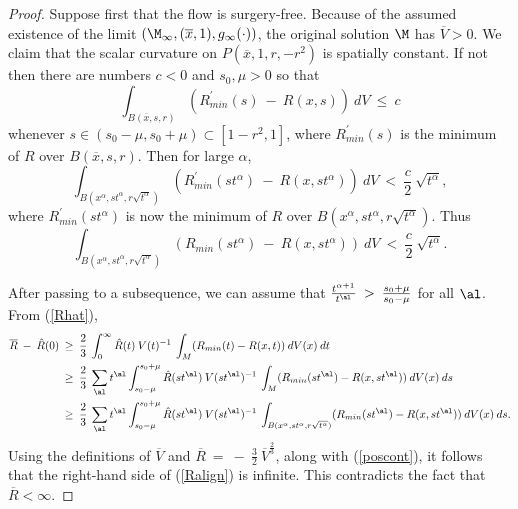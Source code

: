 \begin{proof}
Suppose first that the flow is surgery-free. Because of the assumed existence of the limit
$(\M_\infty, (\overline{x}, 1), g_\infty(\cdot))$, the
original solution $\M$ has $\overline{V} > 0$.
We claim that the scalar curvature
on $P(\overline{x}, 1, r, -r^2)$ is spatially constant.
If not then there are numbers $c<0$ and $s_0, \mu > 0$ so that
\begin{equation}
\int_{B(\overline{x}, {s}, r)} (R^\prime_{min}({s})
\: - \: R(x, {s})) \: dV \: \le \: c
\end{equation}
whenever ${s} \in (s_0 - \mu, s_0 + \mu) \subset [1-r^2, 1]$,
where $R^\prime_{min}({s})$
is the minimum of $R$ over
$B(\overline{x}, {s}, r)$. Then for large $\alpha$,
\begin{equation}
\int_{B(x^\alpha, {s} t^\alpha, r \sqrt{t^\alpha})}
(R^\prime_{min}({s} t^\alpha)
\: - \: R(x, {s} t^\alpha)) \: dV \: < \: \frac{c}{2}
\: \sqrt{t^\alpha},
\end{equation}
where $R^\prime_{min}({s} t^\alpha)$ is now the minimum of $R$ over
$B(x^\alpha, {s} t^\alpha, r \sqrt{t^\alpha})$.
Thus
\begin{equation} \label{poscont}
\int_{B(x^\alpha, {s} t^\alpha, r \sqrt{t^\alpha})}
(R_{min}({s} t^\alpha) \: - \: R(x, {s} t^\alpha)) \:
dV \: < \: \frac{c}{2}
\: \sqrt{t^\alpha}.
\end{equation}

After passing to a subsequence, we can assume that
$\frac{t^{\alpha + 1}}{t^\al} \: > \: \frac{s_0 + \mu}{s_0 - \mu}$ for
all $\al$. From (\ref{Rhat}),
\begin{align} \label{Ralign}
\overline{R} \: - \: \hat{R}(0) \: & \ge \:
\frac23 \: \int_0^\infty \hat{R}(t) \: V(t)^{-1} \:
\int_M (R_{min}(t) - R(x,t)) \: dV(x) \: dt \\
& \ge \:
\frac23 \: \sum_{\al} t^\al
\int_{s_0- \mu}^{s_0 + \mu} \hat{R}(s t^\al) \: V(s t^\al)^{-1} \:
\int_M (R_{min}(s t^\al) - R(x,s t^\al)) \: dV(x) \: ds \notag \\
& \ge \:
\frac23 \: \sum_{\al} t^\al
\int_{s_0- \mu}^{s_0 + \mu} \hat{R}(s t^\al) \: V(s t^\al)^{-1} \:
\int_{B(x^\alpha, {s} t^\alpha, r \sqrt{t^\alpha})}
(R_{min}(s t^\al) - R(x,s t^\al)) \: dV(x) \: ds. \notag
\end{align}
Using the definitions of $\overline{V}$ and $\overline{R} \: = \:
- \: \frac32 \: \overline{V}^{\frac23}$, along with
(\ref{poscont}), it follows that
the right-hand side of (\ref{Ralign}) is infinite.
This contradicts the fact that $\overline{R} < \infty$.


\end{proof}
